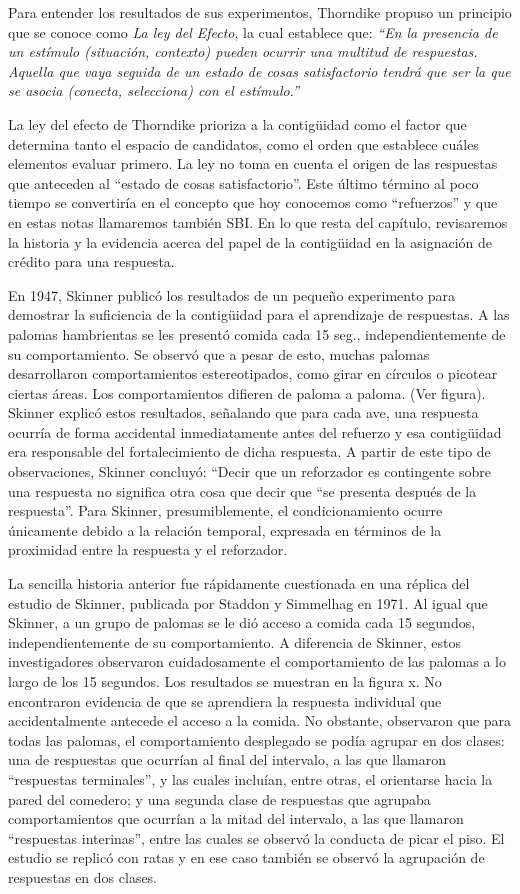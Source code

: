 \documentclass[
  letterpaper,
]{book}
\begin{document}
Para entender los resultados de sus experimentos, Thorndike propuso un
principio que se conoce como \emph{La ley del Efecto}, la cual establece
que: \emph{``En la presencia de un estímulo (situación, contexto) pueden
ocurrir una multitud de respuestas. Aquella que vaya seguida de un
estado de cosas satisfactorio tendrá que ser la que se asocia (conecta,
selecciona) con el estímulo.''}

La ley del efecto de Thorndike prioriza a la contigüidad como el factor
que determina tanto el espacio de candidatos, como el orden que
establece cuáles elementos evaluar primero. La ley no toma en cuenta el
origen de las respuestas que anteceden al ``estado de cosas
satisfactorio''. Este último término al poco tiempo se convertiría en el
concepto que hoy conocemos como ``refuerzos'' y que en estas notas
llamaremos también SBI. En lo que resta del capítulo, revisaremos la
historia y la evidencia acerca del papel de la contigüidad en la
asignación de crédito para una respuesta.

En 1947, Skinner publicó los resultados de un pequeño experimento para
demostrar la suficiencia de la contigüidad para el aprendizaje de
respuestas. A las palomas hambrientas se les presentó comida cada 15
seg., independientemente de su comportamiento. Se observó que a pesar de
esto, muchas palomas desarrollaron comportamientos estereotipados, como
girar en círculos o picotear ciertas áreas. Los comportamientos difieren
de paloma a paloma. (Ver figura). Skinner explicó estos resultados,
señalando que para cada ave, una respuesta ocurría de forma accidental
inmediatamente antes del refuerzo y esa contigüidad era responsable del
fortalecimiento de dicha respuesta. A partir de este tipo de
observaciones, Skinner concluyó: ``Decir que un reforzador es
contingente sobre una respuesta no significa otra cosa que decir que
``se presenta después de la respuesta''. Para Skinner, presumiblemente,
el condicionamiento ocurre únicamente debido a la relación temporal,
expresada en términos de la proximidad entre la respuesta y el
reforzador.

La sencilla historia anterior fue rápidamente cuestionada en una réplica
del estudio de Skinner, publicada por Staddon y Simmelhag en 1971. Al
igual que Skinner, a un grupo de palomas se le dió acceso a comida cada
15 segundos, independientemente de su comportamiento. A diferencia de
Skinner, estos investigadores observaron cuidadosamente el
comportamiento de las palomas a lo largo de los 15 segundos. Los
resultados se muestran en la figura x. No encontraron evidencia de que
se aprendiera la respuesta individual que accidentalmente antecede el
acceso a la comida. No obstante, observaron que para todas las palomas,
el comportamiento desplegado se podía agrupar en dos clases: una de
respuestas que ocurrían al final del intervalo, a las que llamaron
``respuestas terminales'', y las cuales incluían, entre otras, el
orientarse hacia la pared del comedero; y una segunda clase de
respuestas que agrupaba comportamientos que ocurrían a la mitad del
intervalo, a las que llamaron ``respuestas interinas'', entre las cuales
se observó la conducta de picar el piso. El estudio se replicó con ratas
y en ese caso también se observó la agrupación de respuestas en dos
clases.
\end{document}
